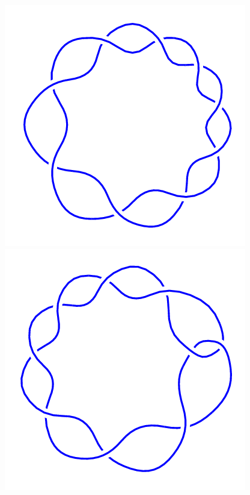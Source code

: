 \begin{figure}[H]
	\begin{minipage}[b]{.18\linewidth}
		\centering
		\includegraphics[width=\linewidth]{../data/9_1.png}
	\end{minipage}
	\begin{minipage}[b]{.18\linewidth}
		\centering
		\includegraphics[width=\linewidth]{../data/9_2.png}

\end{minipage}
\end{figure}
